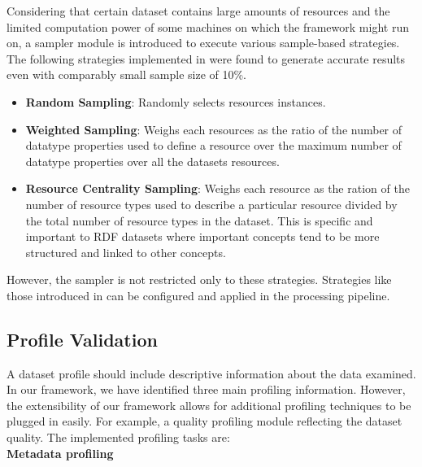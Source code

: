 \documentclass[runningheads,a4paper]{llncs}
\begin{document}
Considering that certain dataset contains large amounts of resources and the limited computation power of some machines on which the framework might run on, a sampler module is introduced to execute various sample-based strategies. The following strategies implemented in \cite{scalableApproach} were found to generate accurate results even with comparably small sample size of 10\%.
\begin{itemize}
  \item \textbf{Random Sampling}: Randomly selects resources instances.
  \item \textbf{Weighted Sampling}: Weighs each resources as the ratio of the number of datatype properties used to define a resource over the maximum number of datatype properties over all the datasets resources.
  \item \textbf{Resource Centrality Sampling}: Weighs each resource as the ration of the number of resource types used to describe a particular resource divided by the total number of resource types in the dataset. This is specific and important to RDF datasets where important concepts tend to be more structured and linked to other concepts.
\end{itemize}

However, the sampler is not restricted only to these strategies. Strategies like those introduced in \cite{Leskovec:2006:SLG:1150402.1150479} can be configured and applied in the processing pipeline.

\subsection{Profile Validation}

A dataset profile should include descriptive information about the data examined. In our framework, we have identified three main profiling information. However, the extensibility of our framework allows for additional profiling techniques to be plugged in easily. For example, a quality profiling module reflecting the dataset quality. The implemented profiling tasks are:\\

\textbf{Metadata profiling}\\
\end{document}
